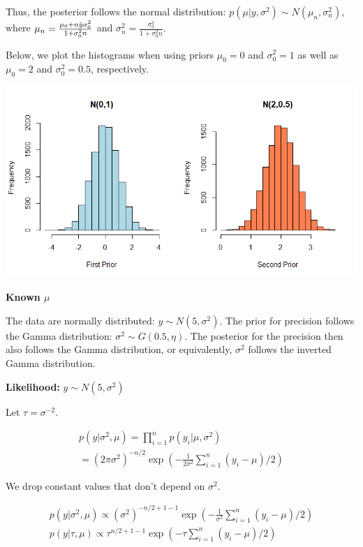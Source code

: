 \documentclass{article}
\begin{document}
Thus, the posterior follows the normal distribution: $p(\mu|y,\sigma^{2}) \sim N(\mu_{n},\sigma_{n}^{2})$, where $\mu_{n}=\frac{\mu_{0}+n\Bar{y}\sigma_{0}^{2}}{1+\sigma_{0}^{2}n}$ and $\sigma_{n}^{2}=\frac{\sigma_{0}^{2}}{1+\sigma_{0}^{2}n}$.

Below, we plot the histograms when using priors $\mu_{0}=0$ and $\sigma_{0}^{2}=1$ as well as $\mu_{0}=2$ and $\sigma_{0}^{2}=0.5$, respectively. 

\includegraphics{Figures and Plots/figure-latex/Rplot 41.png}

\begin{center}
\textbf{Known $\mu$}
\end{center}
\vspace{2em}

The data are normally distributed: $y\sim N(5,\sigma^{2})$.
The prior for precision follows the Gamma distribution: $\sigma^{2} \sim G(0.5,\eta)$. The posterior for the precision then also follows the Gamma distribution, or equivalently, $\sigma^{2}$ follows the inverted Gamma distribution.

\textbf{Likelihood:} $y\sim N(5,\sigma^{2})$

Let $\tau=\sigma^{-2}$.

\begin{align*}
    p(y|\sigma^{2},\mu)=\prod_{i=1}^{n}p(y_{i}|\mu,\sigma^{2}) \\
    = (2\pi\sigma^{2})^{-n/2}\exp(-\frac{1}{2\sigma^{2}}\sum_{i=1}^{n}(y_{i}-\mu)/2)
\end{align*}

We drop constant values that don't depend on $\sigma^{2}$.

\begin{align*}
    p(y|\sigma^{2},\mu)\propto
    (\sigma^{2})^{-n/2+1-1}\exp(-\frac{1}{\sigma^{2}}\sum_{i=1}^{n}(y_{i}-\mu)/2) \\
    p(y|\tau,\mu)\propto
    \tau^{n/2+1-1}\exp(-\tau\sum_{i=1}^{n}(y_{i}-\mu)/2)
\end{align*}
\end{document}
